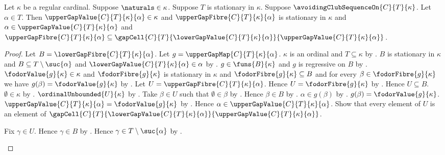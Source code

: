 \begin{theorem}\label{upper_gap_value_and_fibre_properties}
    Let $\kappa$ be a regular cardinal.
    Suppose $\naturals\in\kappa$.
    Suppose $T$ is stationary in $\kappa$.
    Suppose $\avoidingClubSequenceOn{C}{T}{\kappa}$.
    Let $\alpha\in T$.
    Then $\upperGapValue{C}{T}{\kappa}{\alpha}\in\kappa$ and
        $\upperGapFibre{C}{T}{\kappa}{\alpha}$ is stationary in $\kappa$ and
        $\alpha\in\upperGapValue{C}{T}{\kappa}{\alpha}$ and
        $\upperGapFibre{C}{T}{\kappa}{\alpha}\subseteq
            \gapCell{C}{T}{\lowerGapValue{C}{T}{\kappa}{\alpha}}
                {\upperGapValue{C}{T}{\kappa}{\alpha}}$.
\end{theorem}
\begin{proof}
    Let $B=\lowerGapFibre{C}{T}{\kappa}{\alpha}$.
    Let $g=\upperGapMap{C}{T}{\kappa}{\alpha}$.
    $\kappa$ is an ordinal and $T\subseteq\kappa$
        by .
    $B$ is stationary in $\kappa$ and
        $B\subseteq T\setminus\suc{\alpha}$ and
        $\lowerGapValue{C}{T}{\kappa}{\alpha}\in\alpha$
        by .
    $g\in\funs{B}{\kappa}$ and $g$ is regressive on $B$
        by .
    $\fodorValue{g}{\kappa}\in\kappa$ and
        $\fodorFibre{g}{\kappa}$ is stationary in $\kappa$ and
        $\fodorFibre{g}{\kappa}\subseteq B$ and
        for every $\beta\in\fodorFibre{g}{\kappa}$ we have
            $g(\beta)=\fodorValue{g}{\kappa}$
        by .
    Let $U=\upperGapFibre{C}{T}{\kappa}{\alpha}$.
    Hence $U=\fodorFibre{g}{\kappa}$ by .
    Hence $U\subseteq B$.
    $\emptyset\in\kappa$ by .
    $\ordinalUnbounded{U}{\kappa}$ by .
    Take $\beta\in U$ such that $\emptyset\in\beta$
        by .
    Hence $\beta\in B$ by .
    $\alpha\in g(\beta)$ by .
    $g(\beta)=\fodorValue{g}{\kappa}$.
    $\upperGapValue{C}{T}{\kappa}{\alpha}=\fodorValue{g}{\kappa}$
        by .
    Hence $\alpha\in\upperGapValue{C}{T}{\kappa}{\alpha}$.
    Show that every element of $U$ is an element of
        $\gapCell{C}{T}{\lowerGapValue{C}{T}{\kappa}{\alpha}}
            {\upperGapValue{C}{T}{\kappa}{\alpha}}$.
    \begin{subproof}
        Fix $\gamma\in U$.
        Hence $\gamma\in B$ by .
        Hence $\gamma\in T\setminus\suc{\alpha}$ by .

\end{subproof}
\end{proof}
